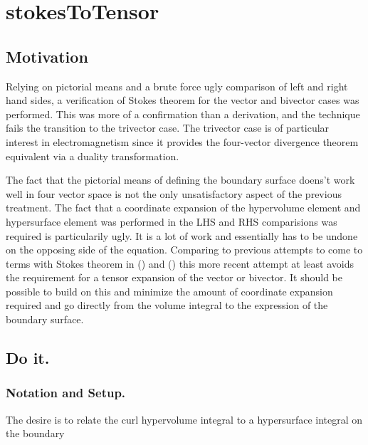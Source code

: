 

\chapter{stokesToTensor}
\label{chap:stokesToTensor}
\date{July 21, 2009}

\beginArtWithToc

\section{Motivation}

Relying on pictorial means and a brute force ugly comparison of left and right hand sides, a verification of Stokes theorem for the vector and bivector cases was performed.  This was more of a confirmation than a derivation, and the technique fails the transition to the trivector case.  The trivector case is of particular interest in electromagnetism since it provides the four-vector divergence theorem equivalent via a duality transformation.

The fact that the pictorial means of defining the boundary surface doens't work well in four vector space is not the only unsatisfactory aspect of the previous treatment.  The fact that a coordinate expansion of the hypervolume element and hypersurface element was performed in the LHS and RHS comparisions was required is particularily ugly.  It is a lot of work and essentially has to be undone on the opposing side of the equation.  Comparing to previous attempts to come to terms with Stokes theorem in (\cite{PJStokes1}) and (\cite{PJStokes2}) this more recent attempt at least avoids the requirement for a tensor expansion of the vector or bivector.  It should be possible to build on this and minimize the amount of coordinate expansion required and go directly from the volume integral to the expression of the boundary surface.

\section{Do it.}
\subsection{Notation and Setup.}

The desire is to relate the curl hypervolume integral to a hypersurface integral on the boundary

